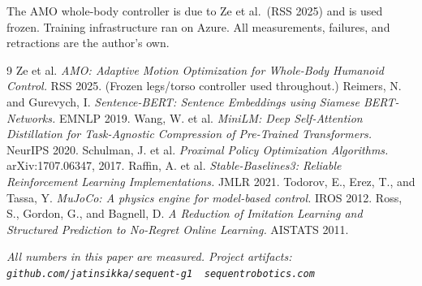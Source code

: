 \documentclass[11pt]{article}
\begin{document}
The AMO whole-body controller is due to Ze et al.\ (RSS 2025) and is used frozen. Training infrastructure ran on Azure. All measurements, failures, and retractions are the author's own.

\begin{thebibliography}{9}
 Ze et al. \emph{AMO: Adaptive Motion Optimization for Whole-Body Humanoid Control.} RSS 2025. (Frozen legs/torso controller used throughout.)
 Reimers, N. and Gurevych, I. \emph{Sentence-BERT: Sentence Embeddings using Siamese BERT-Networks.} EMNLP 2019.
 Wang, W. et al. \emph{MiniLM: Deep Self-Attention Distillation for Task-Agnostic Compression of Pre-Trained Transformers.} NeurIPS 2020.
 Schulman, J. et al. \emph{Proximal Policy Optimization Algorithms.} arXiv:1707.06347, 2017.
 Raffin, A. et al. \emph{Stable-Baselines3: Reliable Reinforcement Learning Implementations.} JMLR 2021.
 Todorov, E., Erez, T., and Tassa, Y. \emph{MuJoCo: A physics engine for model-based control.} IROS 2012.
 Ross, S., Gordon, G., and Bagnell, D. \emph{A Reduction of Imitation Learning and Structured Prediction to No-Regret Online Learning.} AISTATS 2011.
\end{thebibliography}

\vspace{1em}
\noindent\small\emph{All numbers in this paper are measured. Project artifacts: \texttt{github.com/jatinsikka/sequent-g1} \,\textperiodcentered\, \texttt{sequentrobotics.com}}
\end{document}
